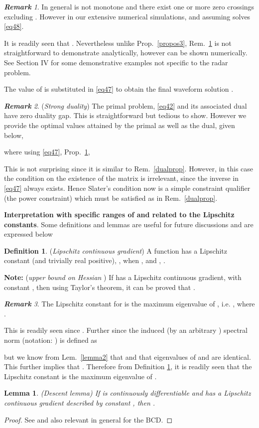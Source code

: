 \documentclass[11pt,draftclsnofoot,onecolumn]{IEEEtran}
\newtheorem{lem}{\bf {Lemma}}
\theoremstyle{definition}
\newtheorem{defn}{\bf Definition}
\theoremstyle{remark}
\newtheorem{remk}{\bf Remark}
\begin{document}
\begin{remk} \label{propos5}
In general  is not monotone and there exist one or more zero crossings excluding . However in our extensive numerical simulations, and assuming  solves \eqref{eq48}.
\end{remk}

It is readily seen that . Nevertheless unlike Prop.~\ref{propos3},  Rem.~\ref{propos5} is not straightforward  to demonstrate analytically, however can be shown numerically. See Section IV for some demonstrative examples not specific to the radar problem.  

The value of  is substituted in \eqref{eq47} to obtain the final waveform solution . 

\begin{remk} \label{remstrongdual}
({\it Strong duality}) The primal problem, \eqref{eq42} and its associated dual have zero duality gap. This is straightforward but tedious to show. However we provide the optimal values attained by the primal as well as the dual, given below,

where using \eqref{eq47}, Prop.~\ref{propos5}, 

\end{remk}
This is not surprising since it is similar to Rem.~\ref{dualprop}. However, in this case the condition on the existence of the matrix is irrelevant, since the inverse in \eqref{eq47} always exists. Hence Slater's condition now is a simple constraint qualifier (the power constraint) which must be satisfied as in Rem.~\ref{dualprop}.

{\bf Interpretation with specific ranges of  and related to the Lipschitz constants}. Some definitions and lemmas are useful for future discussions and are expressed below
 
 \begin{defn}\label{mydef2}
({\it Lipschitz continuous gradient}) A function  has a Lipschitz constant (and trivially real positive), , when , and , .
\end{defn}
{\bf Note:} ({\it upper bound on Hessian} ) If  has a Lipschitz continuous gradient, with constant , then  using Taylor's theorem, it can be proved that .
\begin{remk} \label{remark3}
The Lipschitz constant for  is the maximum eigenvalue of , i.e. , where .
\end{remk}
This is readily seen since . Further since the induced (by  an arbitrary ) spectral norm (notation: ) is defined  as

but we know from Lem.~\ref{lemma2} that  and that eigenvalues of  and  are identical. This further implies that . Therefore from Definition \ref{mydef2}, it is readily seen that the Lipschitz constant is the maximum eigenvalue of . 
\begin{lem}\label{lemma5}
({\it Descent lemma}) If  is continuously differentiable and has a Lipschitz continuous gradient described by constant , then .
\end{lem}
\begin{proof}
See \cite[Prop.~A.24]{Bertsekas1999} and also \cite[Lem2.2]{Beck2013} relevant in general for the BCD.
\end{proof}
\end{document}
